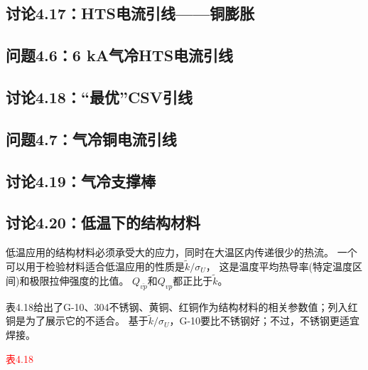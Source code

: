 \subsection{讨论4.17：HTS电流引线——铜膨胀}







\subsection{问题4.6：6 kA气冷HTS电流引线}









\subsection{讨论4.18：“最优”CSV引线}








\subsection{问题4.7：气冷铜电流引线}





\subsection{讨论4.19：气冷支撑棒}





\subsection{讨论4.20：低温下的结构材料}
低温应用的结构材料必须承受大的应力，同时在大温区内传递很少的热流。
一个可以用于检验材料适合低温应用的性质是$\tilde{k}/\sigma_U$，
这是温度平均热导率(特定温度区间)和极限拉伸强度的比值。
$Q_{\bar{vp}}$和$Q_{vp}$都正比于$\tilde{k}$。

表4.18给出了G-10、304不锈钢、黄铜、红铜作为结构材料的相关参数值；列入红铜是为了展示它的不适合。
基于$\tilde{k}/\sigma_U$，G-10要比不锈钢好；不过，不锈钢更适宜焊接。

\textcolor{red}{表4.18}